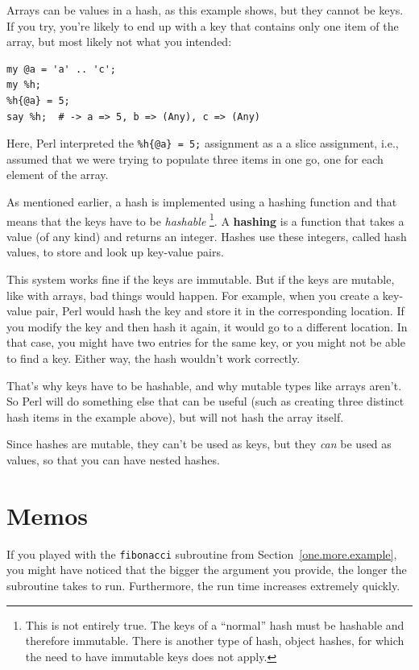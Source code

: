 Arrays can be values in a hash, as this example shows, but they
cannot be keys.  If you try, you're likely to end up with a 
key that contains only one item of the array, but most likely 
not what you intended:

\begin{verbatim}
my @a = 'a' .. 'c';
my %h;
%h{@a} = 5;
say %h;  # -> a => 5, b => (Any), c => (Any)
\end{verbatim}

Here, Perl interpreted the \verb'%h{@a} = 5;' assignment 
as a a slice assignment, i.e., assumed that we were 
trying to populate three items in one go, one for each 
element of the array.

As mentioned earlier, a hash is implemented using
a hashing function and that means that the keys have to 
be \emph{hashable} \footnote{This is not entirely true. The 
keys of a ``normal'' hash must be hashable and therefore 
immutable. There is another type of hash, object hashes, 
for which the need to have immutable keys does not apply.}. 
A {\bf hashing} is a function that takes 
a value (of any kind) and returns an integer.  Hashes use 
these integers, called hash values, to store and look up 
key-value pairs.

This system works fine if the keys are immutable.  But if the
keys are mutable, like with arrays, bad things would happen. For example,
when you create a key-value pair, Perl would hash the key and 
store it in the corresponding location.  If you modify the
key and then hash it again, it would go to a different location.
In that case, you might have two entries for the same key,
or you might not be able to find a key.  Either way, the
hash wouldn't work correctly.

That's why keys have to be hashable, and why mutable types like
arrays aren't. So Perl will do something else that can be 
useful (such as creating three distinct hash items in the 
example above), but will not hash the array itself.

Since hashes are mutable, they can't be used as keys,
but they {\em can} be used as values, so that you can 
have nested hashes.

\section{Memos}
\label{memoize}

If you played with the {\tt fibonacci} subroutine from
Section~\ref{one.more.example}, you might have noticed that 
the bigger the argument you provide, the longer the 
subroutine takes to run. Furthermore, the run time 
increases extremely quickly.

